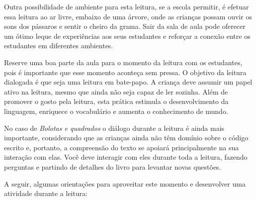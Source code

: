 \documentclass[11pt]{extarticle}
\begin{document}

Outra possibilidade de ambiente para esta leitura, se a escola permitir, 
é efetuar essa leitura ao ar livre, embaixo de uma árvore, onde as crianças 
possam ouvir os sons dos pássaros e sentir o cheiro da grama. Sair da sala 
de aula pode oferecer um ótimo leque de experiências aos seus estudantes e 
reforçar a conexão entre os estudantes em diferentes ambientes.  

Reserve uma boa parte da aula para o momento da leitura com os estudantes, 
pois é importante que esse momento aconteça sem pressa. O objetivo da 
leitura dialogada é que seja uma leitura em bate-papo. A criança deve 
assumir um papel ativo na leitura, mesmo que ainda não seja capaz de 
ler sozinha. Além de promover o gosto pela leitura, esta prática estimula 
o desenvolvimento da linguagem, enriquece o vocabulário e 
aumenta o conhecimento de mundo.

No caso de \textit{Bolotas e quadrados} o diálogo durante a leitura é 
ainda mais importante, considerando que as crianças ainda não têm domínio sobre o código escrito e, portanto, a compreensão do texto se apoiará principalmente na sua interação com elas. 
Você deve interagir com eles durante toda a 
leitura, fazendo perguntas e partindo de detalhes do livro para 
levantar novas questões. 

A seguir, algumas orientações para aproveitar este momento e desenvolver uma atividade durante a leitura: 
\end{document}
